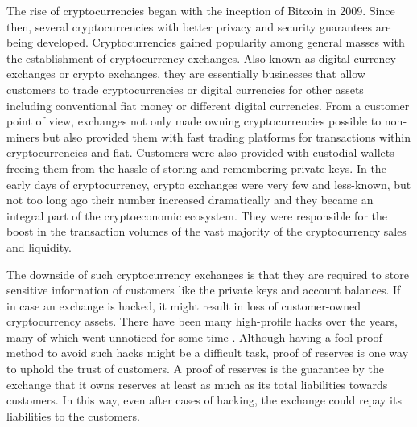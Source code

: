 \begin{Abstract}
The rise of cryptocurrencies began with the inception of Bitcoin in 2009. Since
then, several cryptocurrencies with better privacy and security guarantees are being
developed. Cryptocurrencies gained popularity among general masses with the establishment of cryptocurrency exchanges.
Also known as digital currency exchanges or crypto exchanges, they are essentially businesses that allow customers to trade
cryptocurrencies or digital currencies for other assets including conventional fiat
money or different digital currencies. 
From a customer point of view, exchanges not only made owning cryptocurrencies possible to non-miners but also provided them with fast trading platforms for transactions within cryptocurrencies and fiat.
Customers were also provided with custodial wallets freeing them from the hassle of storing and remembering private keys.
In the early days of cryptocurrency, crypto exchanges were very few and less-known, but not too long ago their number increased dramatically and they became an integral part of the cryptoeconomic ecosystem. 
They were responsible for the boost in the transaction volumes of the vast majority of the cryptocurrency sales and liquidity.

The downside of such cryptocurrency exchanges is that they are required to
store sensitive information of customers like the private keys and account balances.
If in case an exchange is hacked, it might result in loss of customer-owned cryptocurrency assets.
There have been many high-profile hacks over the years, many of which went unnoticed for some time \cite{Cryptohacks}.
Although having a fool-proof method to avoid such hacks might be a difficult task, proof of reserves is one way to uphold the trust of customers.
A proof of reserves is the guarantee by the exchange that it owns reserves at least as much as its total liabilities towards customers. 
In this way, even after cases of hacking, the exchange could repay its liabilities to the customers.


\end{Abstract}

